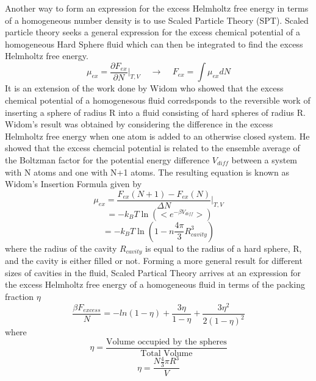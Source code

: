 \documentclass[double,12pt]{beavtex}
\begin{document}
Another way to form an expression for the excess Helmholtz free energy in terms of a homogeneous number density is to use Scaled Particle Theory (SPT).
Scaled particle theory seeks a general expression for the excess chemical potential of a homogeneous Hard Sphere fluid which can then be integrated to find the excess Helmholtz free energy.
\begin{equation}\mu_{ex}=\frac{\partial{F_{ex}}}{\partial{N}}\bigg|_{T,V}{~~~~~}\rightarrow{~~~~~}F_{ex}=\int{\mu_{ex}dN}\end{equation}
It is an extension of the work done by Widom who showed that the excess chemical potential of a homogenesous fluid corredsponds to the reversible work 
of inserting a sphere of radius R into a fluid consisting of hard spheres of radius R. 
Widom's result was obtained by considering the difference in the excess Helmholtz free energy when one atom is added to an otherwise closed system. 
He showed that the excess chemcial potential is related to the ensemble average of the Boltzman factor for the potential energy difference $V_{diff}$ 
between a system with N atoms and one with N+1 atoms. The resulting equation is known as Widom's Insertion Formula given by
\begin{equation}\mu_{ex}=\frac{F_{ex}(N+1)-F_{ex}(N)}{\Delta{N}}\bigg|_{T,V}\end{equation}
\begin{equation}\label{widoms-insertion-formula}{~}=-k_BT\ln\left(<e^{-\beta{V_{diff}}}>\right)\end{equation}
\color{red} \begin{equation}=-k_BT\ln(1-n\frac{4\pi}{3}R_{cavity}^3)\end{equation}
where the radius of the cavity $R_{cavity}$ is equal to the radius of a hard sphere, R, and the cavity is either filled or not. \color{black}%
Forming a more general result for different sizes of cavities in the fluid, Scaled Partical Theory arrives at an expression for the excess Helmholtz free energy of a homogeneous fluid in terms of the packing fraction $\eta$ 
\begin{equation}\label{Fexcess-SPT}{\frac{\beta{F_{excess}}}{N}=-ln(1-\eta)+\frac{3\eta}{1-\eta}+\frac{3{\eta}^2}{2(1-\eta)^2}}\end{equation} 
where
\begin{equation}{\eta = \frac{\mbox{Volume occupied by the spheres}}{\mbox{Total Volume}}}\end{equation}
\begin{equation}{\eta = \frac{N\frac{4}{3}\pi{R^3}}{V}}\end{equation}
\end{document}
